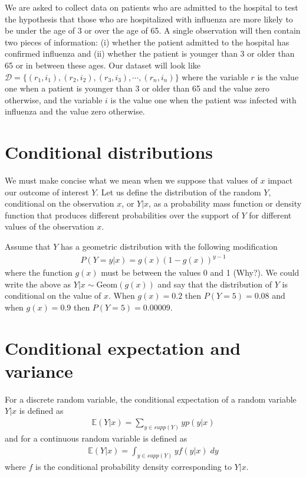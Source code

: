 \ex We are asked to collect data on patients who are admitted to the hospital to test the hypothesis that those who are hospitalized with influenza are more likely to be under the age of 3 or over the age of 65. 
A single observation will then contain two pieces of information: (i) whether the patient admitted to the hospital has confirmed influenza and (ii) whether the patient is younger than 3 or older than 65 or in between these ages. 
Our dataset will look like $\mathcal{D} = \{(r_{1},i_{1}),(r_{2},i_{2}),(r_{3},i_{3}),\cdots,(r_{n},i_{n})  \}$ where the variable $r$ is the value one when a patient is younger than 3 or older than 65 and the value zero otherwise, and the variable $i$ is the value one when the patient was infected with influenza and the value zero otherwise.

\section{Conditional distributions}\label{intro}

We must make concise what we mean when we suppose that values of $x$ impact our outcome of interest $Y$.
Let us define the distribution of the random $Y$, conditional on the observation $x$, or $Y | x$, as a probability mass function or density function that produces different probabilities over the support of $Y$ for different values of the observation $x$.

\ex Assume that $Y$ has a geometric distribution with the following modification
\begin{align}
    P(Y=y | x) = g(x) ( 1-g(x) )^{y-1}  
\end{align}
where the function $g(x)$ must be between the values 0 and 1 (Why?). 
We could write the above as $Y | x \sim \text{Geom}( g(x) )$ and say that the distribution of $Y$ is conditional on the value of $x$.
When $g(x) = 0.2$ then $P(Y=5) = 0.08$ and when $g(x) = 0.9$ then $P(Y=5) = 0.00009$.

\section{Conditional expectation and variance}\label{intro}

For a discrete random variable, the conditional expectation of a random variable $Y|x$ is defined as 
\begin{align}
    \mathbb{E}(Y|x) = \sum_{ y \in supp(Y) } y p(y |x) 
\end{align}
and for a continuous random variable is defined as 
\begin{align}
    \mathbb{E}(Y|x) = \int_{y \in supp(Y)} y f(y | x)  \; dy
\end{align}
where $f$ is the conditional probability density corresponding to $Y|x$.

